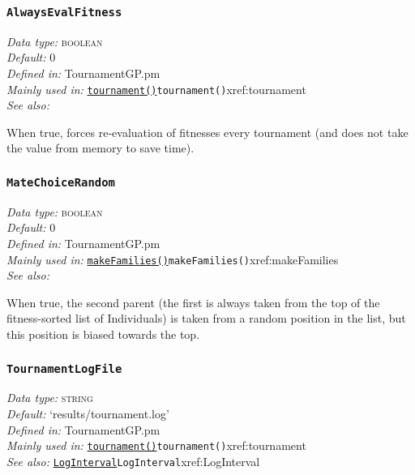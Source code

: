 \documentclass[a4paper]{article}
\begin{document}
\subsubsection{\texttt{AlwaysEvalFitness}}\label{xref:AlwaysEvalFitness}
\begin{flushleft}
\textit{Data type:} \textsc{boolean}\\
\textit{Default:} 0\\
\textit{Defined in:} TournamentGP.pm\\
\textit{Mainly used in:} \hyperref[no]{\texttt{tournament()}}{\texttt{tournament()}}{xref:tournament}\\
\textit{See also:}
\end{flushleft}

When true, forces re-evaluation of fitnesses every tournament (and
does not take the value from memory to save time).

\subsubsection{\texttt{MateChoiceRandom}}\label{xref:MateChoiceRandom}
\begin{flushleft}
\textit{Data type:} \textsc{boolean}\\
\textit{Default:} 0\\
\textit{Defined in:} TournamentGP.pm\\
\textit{Mainly used in:} \hyperref[no]{\texttt{makeFamilies()}}{\texttt{makeFamilies()}}{xref:makeFamilies}\\
\textit{See also:}
\end{flushleft}

When true, the second parent (the first is always taken from the top
of the fitness-sorted list of Individuals) is taken from a random
position in the list, but this position is biased towards the top.

\subsubsection{\texttt{TournamentLogFile}}\label{xref:TournamentLogFile}
\begin{flushleft}
\textit{Data type:} \textsc{string}\\
\textit{Default:} `results/tournament.log'\\
\textit{Defined in:} TournamentGP.pm\\
\textit{Mainly used in:} \hyperref[no]{\texttt{tournament()}}{\texttt{tournament()}}{xref:tournament}\\
\textit{See also:} \hyperref[no]{\texttt{LogInterval}}{\texttt{LogInterval}}{xref:LogInterval}
\end{flushleft}
\end{document}
